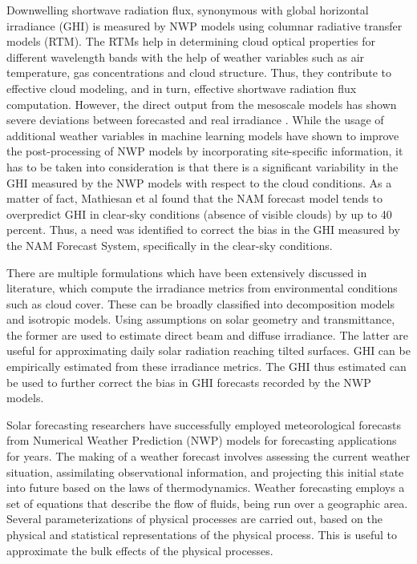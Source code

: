 \par Downwelling shortwave radiation flux, synonymous with global horizontal irradiance (GHI) is measured by NWP models using columnar radiative transfer models (RTM). The RTMs help in determining cloud optical properties for different wavelength bands with the help of weather variables such as air temperature, gas concentrations and cloud structure. Thus, they contribute to effective cloud modeling, and in turn, effective shortwave radiation flux computation. However, the direct output from the mesoscale models has shown severe deviations between forecasted and real irradiance \cite{multimodel_ghi}. While the usage of additional weather variables in machine learning models have shown to improve the post-processing of NWP models by incorporating site-specific information, it has to be taken into consideration is that there is a significant variability in the GHI measured by the NWP models with respect to the cloud conditions. As a matter of fact, Mathiesan et al \cite{multimodel_overpredict} found that the NAM forecast model tends to overpredict GHI in clear-sky conditions (absence of visible clouds) by up to 40 percent. Thus, a need was identified to correct the bias in the GHI measured by the NAM Forecast System, specifically in the clear-sky conditions.

\par There are multiple formulations which have been extensively discussed in literature, which compute the irradiance metrics from environmental conditions such as cloud cover. These can be broadly classified into decomposition models and isotropic models. Using assumptions on solar geometry and transmittance, the former are used to estimate direct beam and diffuse irradiance. The latter are useful for approximating daily solar radiation reaching tilted surfaces. GHI can be empirically estimated from these irradiance metrics. The GHI thus estimated can be used to further correct the bias in GHI forecasts recorded by the NWP models.

Solar forecasting researchers have successfully employed meteorological forecasts from Numerical Weather Prediction (NWP) models for forecasting applications for years. The making of a weather forecast involves assessing the current weather situation, assimilating observational information, and projecting this initial state into future based on the laws of thermodynamics. Weather forecasting employs a set of equations that describe the flow of fluids, being run over a geographic area. Several parameterizations of physical processes are carried out, based on the physical and statistical representations of the physical process. This is useful to approximate the bulk effects of the physical processes.

